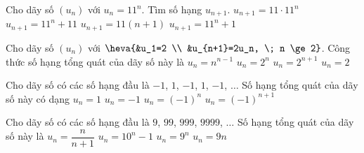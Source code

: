 \begin{ex}%
	Cho dãy số $\left(u_n\right)$ với  $u_n=11^n.$ Tìm số hạng $u_{n+1}$.
	 \choice
		{\True $u_{n+1}=11\cdot11^n$} 
		{$u_{n+1}=11^n+11$} 
		 {$u_{n+1}=11\left(n+1\right)$}
		 {$u_{n+1}=11^n+1$}
\end{ex}

\begin{ex}%
	Cho dãy số  $(u_n)$ với $\heva{&u_1=2 \\ &u_{n+1}=2u_n, \; n \ge 2}$. Công thức số hạng tổng quát của dãy số này là
	\choice 
		{$u_n=n^{n-1}$} 
		{\True  $u_n=2^n$}
		{$u_n=2^{n+1}$} 
		{$u_n=2$} 
\end{ex}

\begin{ex}%
	Cho dãy số có các số hạng đầu là $-1$, $1$, $-1$,  $1$, $-1$, $\ldots$ Số hạng tổng quát của dãy số này có dạng
	 \choice
		 {$u_n=1$}
		 {$u_n=-1$}
		{\True $u_n=(-1)^n$} 
		 {$u_n=(-1)^{n+1}$}
\end{ex}

\begin{ex}%
	Cho dãy số có các số hạng đầu là $9$, $99$, $999$, $9999$, $\ldots$ Số hạng tổng quát  của dãy số này là
	 \choice
		{$u_n=\dfrac{n}{n+1}$} 
		{\True $u_n=10^n-1$} 
		 {$u_n=9^n$}
		 {$u_n=9n$}
\end{ex}

